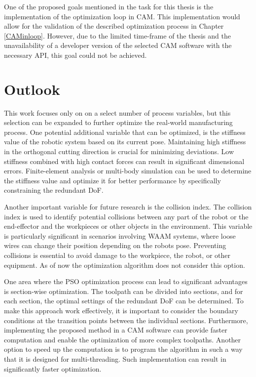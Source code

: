 One of the proposed goals mentioned in the task for this thesis is the implementation of the optimization loop in \acrshort{CAM}. This implementation would allow for the validation of the described optimization process in Chapter \ref{CAMinloop}. However, due to the limited time-frame of the thesis and the unavailability of a developer version of the selected \acrshort{CAM} software with the necessary \acrshort{API}, this goal could not be achieved.


\section{Outlook}\label{Outlook}

This work focuses only on on a select number of process variables, but this selection can be expanded to further optimize the real-world manufacturing process. One potential additional variable that can be optimized, is the stiffness value of the robotic system based on its current pose. Maintaining high stiffness in the orthogonal cutting direction is crucial for minimizing deviations. Low stiffness combined with high contact forces can result in significant dimensional errors. Finite-element analysis or multi-body simulation can be used to determine the stiffness value and optimize it for better performance by specifically constraining the redundant \acrshort{DoF}.

Another important variable for future research is the collision index. The collision index is used to identify potential collisions between any part of the robot or the end-effector and the workpieces or other objects in the environment. This variable is particularly significant in scenarios involving \acrshort{WAAM} systems, where loose wires can change their position depending on the robots pose. Preventing collisions is essential to avoid damage to the workpiece, the robot, or other equipment. As of now the optimization algorithm does not consider this option.

One area where the \acrshort{PSO} optimization process can lead to significant advantages is section-wise optimization. The toolpath can be divided into sections, and for each section, the optimal settings of the redundant \acrshort{DoF} can be determined. To make this approach work effectively, it is important to consider the boundary conditions at the transition points between the individual sections.
Furthermore, implementing the proposed method in a \acrshort{CAM} software can provide faster computation and enable the optimization of more complex toolpaths. Another option to speed up the computation is to program the algorithm in such a way that it is designed for multi-threading. Such implementation can result in significantly faster optimization.  

